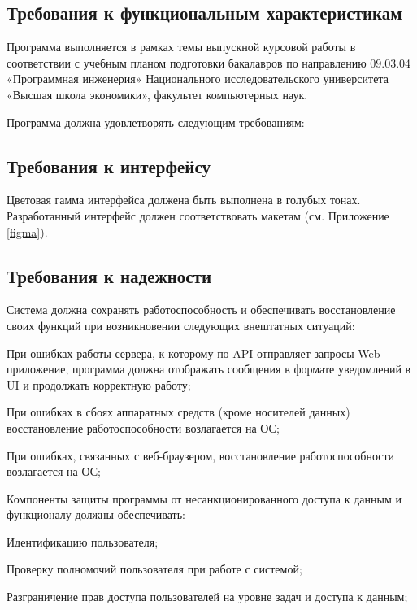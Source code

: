 \documentclass[a4paper,12pt,reqno]{article}
\begin{document}
	\subsection{Требования к функциональным характеристикам}
	Программа выполняется в рамках темы выпускной курсовой работы в соответствии с учебным планом подготовки бакалавров по направлению 09.03.04 «Программная инженерия» Национального исследовательского университета «Высшая школа экономики», факультет компьютерных наук.
	
	Программа должна удовлетворять следующим требованиям:
	
	
	
	\subsection{Требования к интерфейсу}
	Цветовая гамма интерфейса должена быть выполнена в голубых тонах. Разработанный интерфейс должен соответствовать макетам (см. Приложение \ref{figma}).
	
	\subsection{Требования к надежности}
	
 
	
	\begin{nfr}
	    \item Система должна сохранять работоспособность и обеспечивать восстановление своих функций при возникновении следующих внештатных ситуаций:
	    \begin{nfr}
	    \item При ошибках работы сервера, к которому по API отправляет запросы Web-приложение, программа должна отображать сообщения в формате уведомлений в UI и продолжать корректную работу;
        \item При ошибках в сбоях аппаратных средств (кроме носителей данных) восстановление работоспособности возлагается на ОС;
        \item При ошибках, связанных с веб-браузером, восстановление работоспособности возлагается на ОС;
	\end{nfr}
	\item Компоненты защиты программы от несанкционированного доступа к данным и функционалу должны обеспечивать:
	\begin{nfr}
	\item Идентификацию пользователя;
	\item Проверку полномочий пользователя при работе с системой;
	\item Разграничение прав доступа пользователей на уровне задач и доступа к данным;
    \end{nfr}
	\end{nfr}
    
\end{document}
